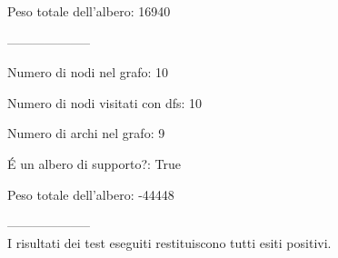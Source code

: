 Peso totale dell'albero:  16940

--------------------

Numero di nodi nel grafo:  10

Numero di nodi visitati con dfs:  10

Numero di archi nel grafo:  9

É un albero di supporto?:  True

Peso totale dell'albero:  -44448

--------------------
\newline \\
I risultati dei test eseguiti restituiscono tutti esiti positivi.

    

